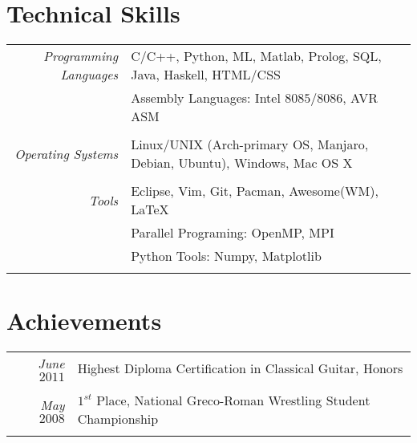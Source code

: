 \documentclass[a4paper,10pt]{article}
\begin{document}
\section{Technical Skills}
\begin{tabular}{r|p{11cm}}
\textit{Programming Languages} & C/C++, Python, ML, Matlab, Prolog, SQL, Java, Haskell, HTML/CSS
\\&Assembly Languages: Intel $8085$/$8086$, AVR ASM\\\multicolumn{2}{c}{}\\
\textit{Operating Systems} & Linux/UNIX (Arch-primary OS, Manjaro, Debian, Ubuntu), Windows, Mac OS X\\\multicolumn{2}{c}{}\\
\textit{Tools} & Eclipse, Vim, Git, Pacman, Awesome(WM), \LaTeX\
\\&Parallel Programing: OpenMP, MPI
\\&Python Tools: Numpy, Matplotlib\\\multicolumn{2}{c}{}
\end{tabular}

\section{Achievements}
\begin{tabular}{r|p{11cm}}
\textit{June $2011$} & Highest Diploma Certification in Classical Guitar, Honors\\\multicolumn{2}{c}{}\\
\textit{May $2008$} & $1^{st}$ Place, National Greco-Roman Wrestling Student Championship\\\multicolumn{2}{c}{}
\end{tabular}
\end{document}
